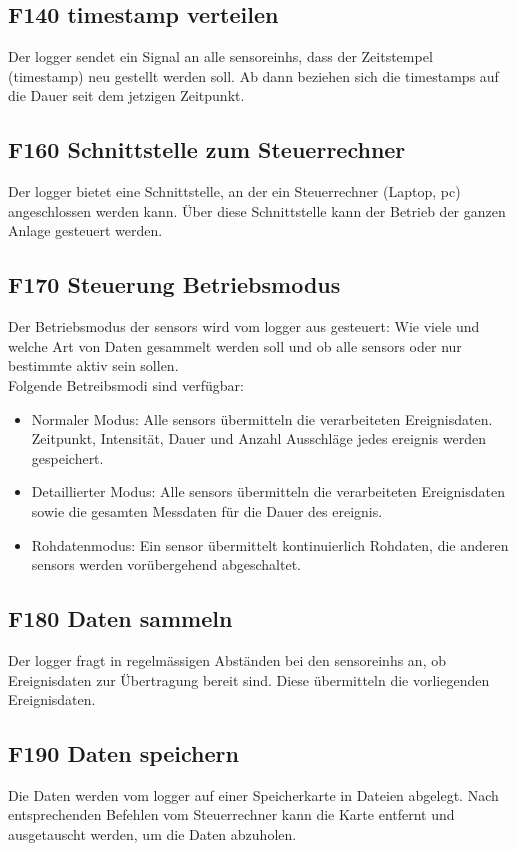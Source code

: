 \subsection{F140 \gls{timestamp} verteilen}
Der \gls{logger} sendet ein Signal an alle \glspl{sensoreinh}, dass der Zeitstempel (\gls{timestamp}) neu gestellt werden soll. Ab dann beziehen sich die \gls{timestamp}s auf die Dauer seit dem jetzigen Zeitpunkt.


\subsection{F160 Schnittstelle zum Steuerrechner}
Der \gls{logger} bietet eine Schnittstelle, an der ein Steuerrechner (Laptop, \gls{pc}) angeschlossen werden kann. Über diese Schnittstelle kann der Betrieb der ganzen Anlage gesteuert werden.


\subsection{F170 Steuerung Betriebsmodus}
Der Betriebsmodus der \glspl{sensor} wird vom \gls{logger} aus gesteuert: Wie viele und welche Art von Daten gesammelt werden soll und ob alle \glspl{sensor} oder nur bestimmte aktiv sein sollen. \\
Folgende Betreibsmodi sind verfügbar:
\begin{itemize}
\item Normaler Modus: Alle \glspl{sensor} übermitteln die verarbeiteten Ereignisdaten. Zeitpunkt, Intensität, Dauer und Anzahl Ausschläge jedes \gls{ereignis} werden gespeichert.
\item Detaillierter Modus: Alle \glspl{sensor} übermitteln die verarbeiteten Ereignisdaten sowie die gesamten Messdaten für die Dauer des \gls{ereignis}.
\item Rohdatenmodus: Ein \gls{sensor} übermittelt kontinuierlich Rohdaten, die anderen \glspl{sensor} werden vorübergehend abgeschaltet.
\end{itemize}


\subsection{F180 Daten sammeln}
Der \gls{logger} fragt in regelmässigen Abständen bei den \glspl{sensoreinh} an, ob Ereignisdaten zur Übertragung bereit sind. Diese übermitteln die vorliegenden Ereignisdaten.


\subsection{F190 Daten speichern}
Die Daten werden vom \gls{logger} auf einer Speicherkarte in Dateien abgelegt. Nach entsprechenden Befehlen vom Steuerrechner kann die Karte entfernt und ausgetauscht werden, um die Daten abzuholen.


